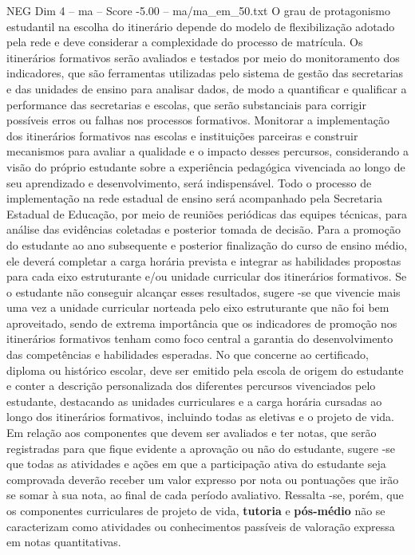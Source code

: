\begin{textsample}{NEG Dim 4 – ma – Score -5.00 – ma/ma\_em\_50.txt}
O grau de protagonismo estudantil na escolha do itinerário depende do modelo de flexibilização adotado pela rede e deve considerar a complexidade do processo de matrícula.
Os itinerários formativos serão avaliados e testados por meio do monitoramento dos indicadores, que são ferramentas utilizadas pelo sistema de gestão das secretarias e das unidades de ensino para analisar dados, de modo a quantificar e qualificar a performance das secretarias e escolas, que serão substanciais para corrigir possíveis erros ou falhas nos processos formativos.
Monitorar a implementação dos itinerários formativos nas escolas e instituições parceiras e construir mecanismos para avaliar a qualidade e o impacto desses percursos, considerando a visão do próprio estudante sobre a experiência pedagógica vivenciada ao longo de seu aprendizado e desenvolvimento, será indispensável.
Todo o processo de implementação na rede estadual de ensino será acompanhado pela Secretaria Estadual de Educação, por meio de reuniões periódicas das equipes técnicas, para análise das evidências coletadas e posterior tomada de decisão.
Para a promoção do estudante ao ano subsequente e posterior finalização do curso de ensino médio, ele deverá completar a carga horária prevista e integrar as habilidades propostas para cada eixo estruturante e/ou unidade curricular dos itinerários formativos.
Se o estudante não conseguir alcançar esses resultados, sugere -se que vivencie mais uma vez a unidade curricular norteada pelo eixo estruturante que não foi bem aproveitado, sendo de extrema importância que os indicadores de promoção nos itinerários formativos tenham como foco central a garantia do desenvolvimento das competências e habilidades esperadas.
No que concerne ao certificado, diploma ou histórico escolar, deve ser emitido pela escola de origem do estudante e conter a descrição personalizada dos diferentes percursos vivenciados pelo estudante, destacando as unidades curriculares e a carga horária cursadas ao longo dos itinerários formativos, incluindo todas as eletivas e o projeto de vida.
Em relação aos componentes que devem ser avaliados e ter notas, que serão registradas para que fique evidente a aprovação ou não do estudante, sugere -se que todas as atividades e ações em que a participação ativa do estudante seja comprovada deverão receber um valor expresso por nota ou pontuações que irão se somar à sua nota, ao final de cada período avaliativo.
Ressalta -se, porém, que os componentes curriculares de projeto de vida, \textbf{tutoria} e \textbf{pós-médio} não se caracterizam como atividades ou conhecimentos passíveis de valoração expressa em notas quantitativas.

\end{textsample}

